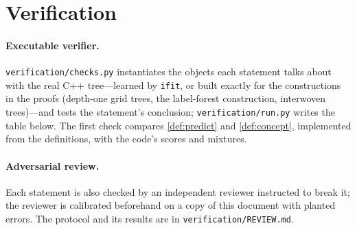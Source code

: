 \documentclass[11pt]{article}
\theoremstyle{definition}
\theoremstyle{remark}
\begin{document}
\appendix
\section{Verification}\label{app:verify}

\paragraph{Executable verifier.}
\texttt{verification/checks.py} instantiates the objects each statement talks about with
the real C++ tree---learned by \texttt{ifit}, or built exactly for the constructions in
the proofs (depth-one grid trees, the label-forest construction, interwoven trees)---and
tests the statement's conclusion; \texttt{verification/run.py} writes the table below.
The first check compares \cref{def:predict} and \cref{def:concept}, implemented from the
definitions, with the code's scores and mixtures.


\paragraph{Adversarial review.}
Each statement is also checked by an independent reviewer instructed to break it; the
reviewer is calibrated beforehand on a copy of this document with planted errors.  The
protocol and its results are in \texttt{verification/REVIEW.md}.



\end{document}
